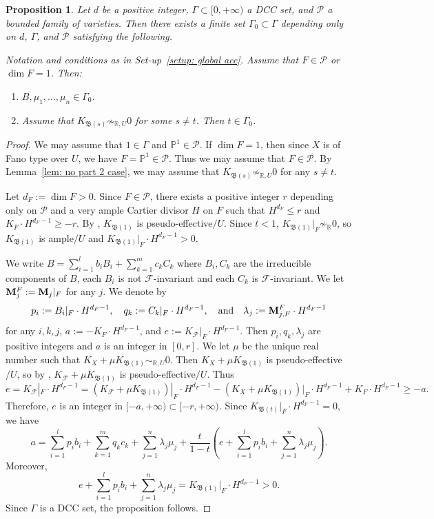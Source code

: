 \documentclass[11pt,reqno]{amsart}
\numberwithin{equation}{section}
\newcommand{\Mm}{{\bf{M}}}
\newcommand{\Bb}{{\mathfrak{B}}}
\newcommand{\Ff}{\mathcal{F}}
\newcommand{\Ii}{\Gamma}
\newtheorem{prop}[thm]{Proposition}
\theoremstyle{definition}
\begin{document}
\begin{prop}\label{prop: when fiber bounded}
Let $d$ be a positive integer, $\Ii\subset [0,+\infty)$ a DCC set, and $\mathcal{P}$ a bounded family of varieties. Then there exists a finite set $\Ii_0\subset\Ii$ depending only on $d$, $\Ii$, and $\mathcal{P}$ satisfying the following.

Notation and conditions as in Set-up~\ref{setup: global acc}. Assume that $F\in\mathcal{P}$ or $\dim F=1$. Then:
\begin{enumerate}
    \item $B,\mu_1,\dots,\mu_n\in\Ii_0$.
    \item Assume that $K_{\Bb(s)}\not\sim_{\mathbb R,U}0$ for some $s\neq t$. Then $t\in\Ii_0$.
\end{enumerate}
\end{prop}
\begin{proof}
We may assume that $1\in\Ii$ and $\mathbb P^1\in\mathcal{P}$. If $\dim F=1$, then since $X$ is of Fano type over $U$, we have $F=\mathbb P^1\in\mathcal{P}$. Thus we may assume that $F\in\mathcal{P}$. By Lemma~\ref{lem: no part 2 case}, we may assume that $K_{\Bb(s)}\not\sim_{\mathbb R,U}0$ for any $s\neq t$.

Let $d_F:=\dim F>0$. Since $F\in\mathcal{P}$, there exists a positive integer $r$ depending only on $\mathcal{P}$ and a very ample Cartier divisor $H$ on $F$ such that $H^{d_F}\leq r$ and $K_F\cdot H^{d_F-1}\geq -r$. By \cite[Theorem~5.1]{Cas+25a}, $K_{\Bb(1)}$ is pseudo-effective$/U$. Since $t<1$, $K_{\Bb(1)}|_F\not\sim_{\mathbb R}0$, so $K_{\Bb(1)}$ is ample$/U$ and $K_{\Bb(1)}|_F\cdot H^{d_F-1}>0$.

We write $B=\sum_{i=1}^l b_iB_i+\sum_{k=1}^m c_kC_k$ where $B_i,C_k$ are the irreducible components of $B$, each $B_i$ is not $\Ff$-invariant and each $C_k$ is $\Ff$-invariant. We let $\Mm_j^F:=\Mm_j|_F$ for any $j$. We denote by
$$p_i:=B_i|_F\cdot H^{d_F-1},\quad q_k:=C_k|_F\cdot H^{d_F-1},\quad \text{and}\quad  \lambda_j:=\Mm_{j,F}^F\cdot H^{d_F-1}$$
for any $i,k,j$, $a:=-K_F\cdot H^{d_F-1}$, and $e:=K_{\Ff}|_F\cdot H^{d_F-1}$. Then $p_i,q_k,\lambda_j$ are positive integers and $a$ is an integer in $[0,r]$. We let $\mu$ be the unique real number such that $K_X+\mu K_{\Bb(1)}\sim_{\mathbb R,U}0$. Then $K_X+\mu K_{\Bb(1)}$ is pseudo-effective$/U$, so by \cite[Theorem~5.1]{Cas+25a}, $K_{\Ff}+\mu K_{\Bb(1)}$ is pseudo-effective$/U$. Thus
$$e=K_{\Ff}|_F\cdot H^{d_F-1}=(K_{\Ff}+\mu K_{\Bb(1)})|_F\cdot H^{d_F-1}-(K_{X}+\mu K_{\Bb(1)})|_F\cdot H^{d_F-1}+K_F\cdot H^{d_F-1}\geq -a.$$
Therefore, $e$ is an integer in $[-a,+\infty)\subset [-r,+\infty)$. Since $K_{\Bb(t)}|_F\cdot H^{d_F-1}=0$, we have
$$a=\sum_{i=1}^lp_ib_i+\sum_{k=1}^mq_kc_k+\sum_{j=1}^n\lambda_j\mu_j+\frac{t}{1-t}\left(e+\sum_{i=1}^lp_ib_i+\sum_{j=1}^n\lambda_j\mu_j\right).$$
Moreover,
$$e+\sum_{i=1}^lp_ib_i+\sum_{j=1}^n\lambda_j\mu_j=K_{\Bb(1)}|_F\cdot H^{d_F-1}>0.$$
Since $\Ii$ is a DCC set, the proposition follows.
\end{proof}
\end{document}

